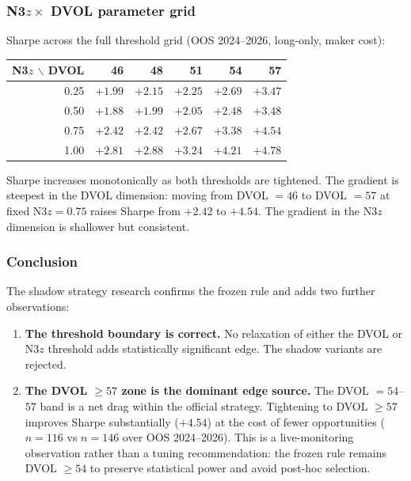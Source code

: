 \documentclass[12pt, a4paper]{article}
\theoremstyle{definition}
\begin{document}
\subsubsection*{N3$z \times$ DVOL parameter grid}

Sharpe across the full threshold grid (OOS 2024--2026, long-only, maker cost):

\begin{center}
\begin{tabular}{r|rrrrr}
\toprule
N3$z$ $\backslash$ DVOL & 46 & 48 & 51 & 54 & 57 \\
\midrule
0.25 & $+1.99$ & $+2.15$ & $+2.25$ & $+2.69$ & $+3.47$ \\
0.50 & $+1.88$ & $+1.99$ & $+2.05$ & $+2.48$ & $+3.48$ \\
0.75 & $+2.42$ & $+2.42$ & $+2.67$ & $+3.38$ & $+4.54$ \\
1.00 & $+2.81$ & $+2.88$ & $+3.24$ & $+4.21$ & $+4.78$ \\
\bottomrule
\end{tabular}
\end{center}

Sharpe increases monotonically as both thresholds are tightened.  The gradient
is steepest in the DVOL dimension: moving from DVOL $= 46$ to DVOL $= 57$
at fixed N3$z = 0.75$ raises Sharpe from $+2.42$ to $+4.54$.  The gradient in
the N3$z$ dimension is shallower but consistent.

\subsubsection*{Conclusion}

The shadow strategy research confirms the frozen rule and adds two further
observations:

\begin{enumerate}
  \item \textbf{The threshold boundary is correct.}  No relaxation of either
        the DVOL or N3$z$ threshold adds statistically significant edge.  The
        shadow variants are rejected.

  \item \textbf{The DVOL $\geq 57$ zone is the dominant edge source.}  The
        DVOL $= 54$--$57$ band is a net drag within the official strategy.
        Tightening to DVOL $\geq 57$ improves Sharpe substantially ($+4.54$)
        at the cost of fewer opportunities ($n = 116$ vs $n = 146$ over OOS
        2024--2026).  This is a live-monitoring observation rather than a tuning
        recommendation: the frozen rule remains DVOL $\geq 54$ to preserve
        statistical power and avoid post-hoc selection.
\end{enumerate}
\end{document}
